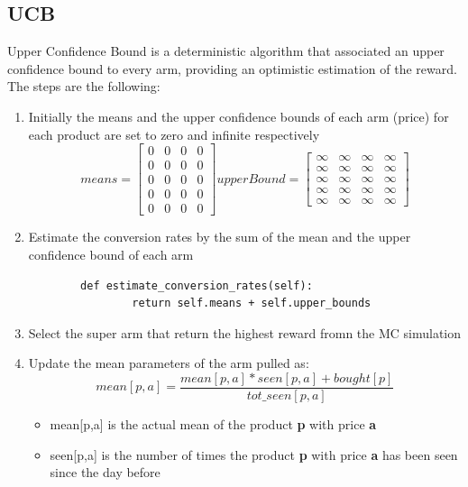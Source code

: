 \subsection{UCB}
Upper Confidence Bound is a deterministic algorithm that associated an upper confidence bound to every arm, providing an optimistic estimation of the reward.
The steps are the following:
\begin{enumerate}
    \item Initially the means and the upper confidence bounds of each arm (price) for each product are set to zero and infinite respectively \[ means=
    \begin{bmatrix}
            0 & 0 & 0 & 0\\
            0 & 0 & 0 & 0\\
            0 & 0 & 0 & 0\\
            0 & 0 & 0 & 0\\
            0 & 0 & 0 & 0
    \end{bmatrix}upperBound=
    \begin{bmatrix}
            \infty & \infty & \infty & \infty\\
            \infty & \infty & \infty & \infty\\
            \infty & \infty & \infty & \infty\\
            \infty & \infty & \infty & \infty\\
            \infty & \infty & \infty & \infty
    \end{bmatrix}
    \]
    \item Estimate the conversion rates by the sum of the mean and the upper confidence bound of each arm\begin{verbatim}
        def estimate_conversion_rates(self):
                return self.means + self.upper_bounds
        \end{verbatim}
    \item Select the super arm that return the highest reward fromn the MC simulation
    \item Update the mean parameters of the arm pulled as:\begin{equation}
            mean[p,a] = \frac{mean[p,a] * seen[p,a] + bought[p]}{tot\_seen[p,a]}
        \end{equation}
        \begin{itemize}
            \item mean[p,a] is the actual mean of the product {\bf p} with price {\bf a}
            \item seen[p,a] is the number of times the product {\bf p} with price {\bf a} has been seen since the day before

\end{itemize}
\end{enumerate}
